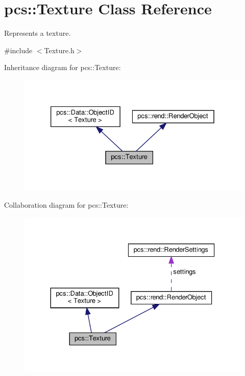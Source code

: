 \hypertarget{classpcs_1_1Texture}{}\section{pcs\+:\+:Texture Class Reference}
\label{classpcs_1_1Texture}


Represents a texture.  




{\ttfamily \#include $<$Texture.\+h$>$}



Inheritance diagram for pcs\+:\+:Texture\+:\nopagebreak
\begin{figure}[H]
\begin{center}
\leavevmode
\includegraphics[width=326pt]{classpcs_1_1Texture__inherit__graph}
\end{center}
\end{figure}


Collaboration diagram for pcs\+:\+:Texture\+:\nopagebreak
\begin{figure}[H]
\begin{center}
\leavevmode
\includegraphics[width=330pt]{classpcs_1_1Texture__coll__graph}
\end{center}
\end{figure}
